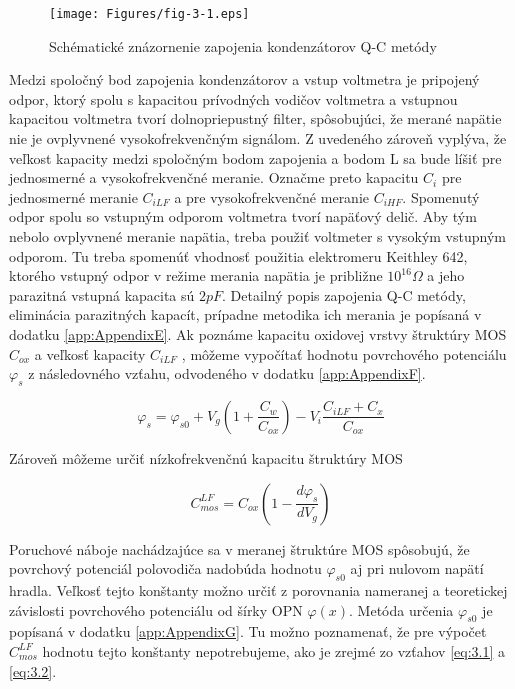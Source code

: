 \begin{figure}[h!]\centering
\texttt{[image: Figures/fig-3-1.eps]}
\captionsetup{justification=raggedright, singlelinecheck=false}
\caption[Schématické znázornenie zapojenia kondenzátorov Q-C 
metódy]{Schématické znázornenie zapojenia kondenzátorov Q-C 
metódy}
\label{fig:3.1}
\end{figure}

Medzi spoločný bod zapojenia kondenzátorov a vstup voltmetra je
pripojený odpor, ktorý spolu s kapacitou prívodných vodičov voltmetra
a vstupnou kapacitou voltmetra tvorí dolnopriepustný filter,
spôsobujúci, že merané napätie nie je ovplyvnené vysokofrekvenčným
signálom. Z uvedeného zároveň vyplýva, že veľkost kapacity medzi
spoločným bodom zapojenia a bodom L sa bude líšiť pre jednosmerné a
vysokofrekvenčné meranie. Označme preto kapacitu $C_i$ pre jednosmerné
meranie $C_{iLF}$ a pre vysokofrekvenčné meranie $C_{iHF}$.  Spomenutý
odpor spolu so vstupným odporom voltmetra tvorí napäťový delič.  Aby
tým nebolo ovplyvnené meranie napätia, treba použiť voltmeter s
vysokým vstupným odporom.  Tu treba spomenúť vhodnosť použitia
elektromeru Keithley 642, ktorého vstupný odpor v režime merania
napätia je približne $10^{16} \Omega$ a jeho parazitná vstupná
kapacita sú $2 pF$. Detailný popis zapojenia Q-C metódy, eliminácia
parazitných kapacít, prípadne metodika ich merania je popísaná v
dodatku \ref{app:AppendixE}. Ak poznáme kapacitu oxidovej vrstvy
štruktúry MOS $C_{ox}$ a veľkosť kapacity $C_{iLF}$ , môžeme vypočítať
hodnotu povrchového potenciálu $\varphi_s$ z následovného vzťahu,
odvodeného v dodatku \ref{app:AppendixF}.

\begin{equation}
\varphi_s = \varphi_{s0} + V_g ( 1 + \frac{C_w}{C_{ox}}) - V_i \frac{C_{iLF}+C_x}{C_{ox}}
\label{eq:3.1}
\end{equation}

Zároveň môžeme určiť nízkofrekvenčnú kapacitu štruktúry MOS

\begin{equation}
C^{LF}_{mos} = C_{ox} ( 1 - \frac{d\varphi_s}{dV_g})
\label{eq:3.2}
\end{equation}

Poruchové náboje nachádzajúce sa v meranej štruktúre MOS spôsobujú, že
povrchový potenciál polovodiča nadobúda hodnotu $\varphi_{s0}$ aj pri
nulovom napätí hradla. Veľkosť tejto konštanty možno určiť z
porovnania nameranej a teoretickej závislosti povrchového potenciálu
od šírky OPN $\varphi(x)$.  Metóda určenia $\varphi_{s0}$ je popísaná
v dodatku \ref{app:AppendixG}. Tu možno poznamenať, že pre výpočet
$C^{LF}_{mos}$ hodnotu tejto konštanty nepotrebujeme, ako je zrejmé zo
vzťahov \ref{eq:3.1} a \ref{eq:3.2}.

